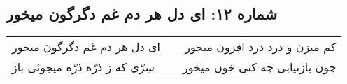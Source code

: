\begin{center}
\section*{شماره ۱۲: ای دل هر دم غم دگرگون میخور}
\label{sec:012}
\begin{longtable}{l p{0.5cm} r}
ای دل هر دم غم دگرگون میخور
&&
کم میزن و درد درد افزون میخور
\\
سِرّی که ز ذرّهَ ذرّه میجوئی باز
&&
چون بازنیابی چه کنی خون میخور
\\
\end{longtable}
\end{center}
